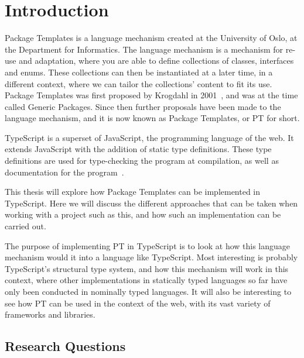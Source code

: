 
\chapter{Introduction}\label{ch:introduction}


Package Templates is a language mechanism created at the University of Oslo, at the Department for Informatics.
The language mechanism is a mechanism for re-use and adaptation, where you are able to define collections of classes, interfaces and enums.
These collections can then be instantiated at a later time, in a different context, where we can tailor the collections' content to fit its use.
Package Templates was first proposed by Krogdahl in 2001~\cite{krogdahl:GP}, and was at the time called Generic Packages.
Since then further proposals have been made to the language mechanism, and it is now known as Package Templates, or PT for short.

TypeScript is a superset of JavaScript, the programming language of the web.
It extends JavaScript with the addition of static type definitions.
These type definitions are used for type-checking the program at compilation, as well as documentation for the program~\cite{tswebsite}.

This thesis will explore how Package Templates can be implemented in TypeScript.
Here we will discuss the different approaches that can be taken when working with a project such as this, and how such an implementation can be carried out.

The purpose of implementing PT in TypeScript is to look at how this language mechanism would it into a language like TypeScript.
Most interesting is probably TypeScript's structural type system, and how this mechanism will work in this context, where other implementations in statically typed languages so far have only been conducted in nominally typed languages.
It will also be interesting to see how PT can be used in the context of the web, with its vast variety of frameworks and libraries.

\section{Research Questions}\label{sec:research-questions}

